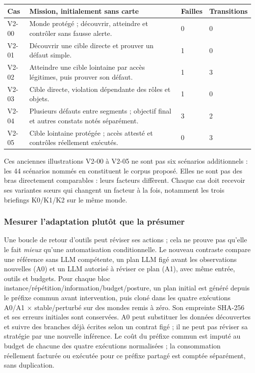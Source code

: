 \documentclass[11pt,a4paper]{article}
\newcommand{\code}[1]{{\small\ttfamily\path{#1}}}
\begin{document}
\begin{tabularx}{\textwidth}{@{}P{16mm}Y P{12mm}P{19mm}@{}}\toprule
Cas & Mission, initialement sans carte & Failles & Transitions\\\midrule
V2-00 & Monde protégé ; découvrir, atteindre et contrôler sans fausse alerte. & 0 & 0\\
V2-01 & Découvrir une cible directe et prouver un défaut simple. & 1 & 0\\
V2-02 & Atteindre une cible lointaine par accès légitimes, puis prouver son défaut. & 1 & 3\\
V2-03 & Cible directe, violation dépendante des rôles et objets. & 1 & 0\\
V2-04 & Plusieurs défauts entre segments ; objectif final et autres constats notés séparément. & 3 & 2\\
V2-05 & Cible lointaine protégée ; accès attesté et contrôles réellement exécutés. & 0 & 3\\\bottomrule
\end{tabularx}
\normalsize
Ces anciennes illustrations V2-00 à V2-05 ne sont pas six scénarios additionnels : les 44 scénarios nommés en \code{s_} constituent le corpus proposé. Elles ne sont pas des bras directement comparables : leurs facteurs diffèrent. Chaque cas doit recevoir ses variantes sœurs qui changent un facteur à la fois, notamment les trois briefings K0/K1/K2 sur le même monde.

\subsubsection{Mesurer l'adaptation plutôt que la présumer}
Une boucle de retour d'outils peut réviser ses actions ; cela ne prouve pas qu'elle le fait \emph{mieux} qu'une automatisation conditionnelle. Le nouveau contraste compare une référence sans LLM compétente, un plan LLM figé avant les observations nouvelles (A0) et un LLM autorisé à réviser ce plan (A1), avec même entrée, outils et budgets. Pour chaque bloc instance/répétition/information/budget/posture, un plan initial est généré depuis le préfixe commun avant intervention, puis cloné dans les quatre exécutions A0/A1 $\times$ stable/perturbé sur des mondes remis à zéro. Son empreinte SHA-256 et ses erreurs initiales sont conservées. A0 peut substituer les données découvertes et suivre des branches déjà écrites selon un contrat figé ; il ne peut pas réviser sa stratégie par une nouvelle inférence. Le coût du préfixe commun est imputé au budget de chacune des quatre exécutions normalisées ; la consommation réellement facturée ou exécutée pour ce préfixe partagé est comptée séparément, sans duplication.
\end{document}
